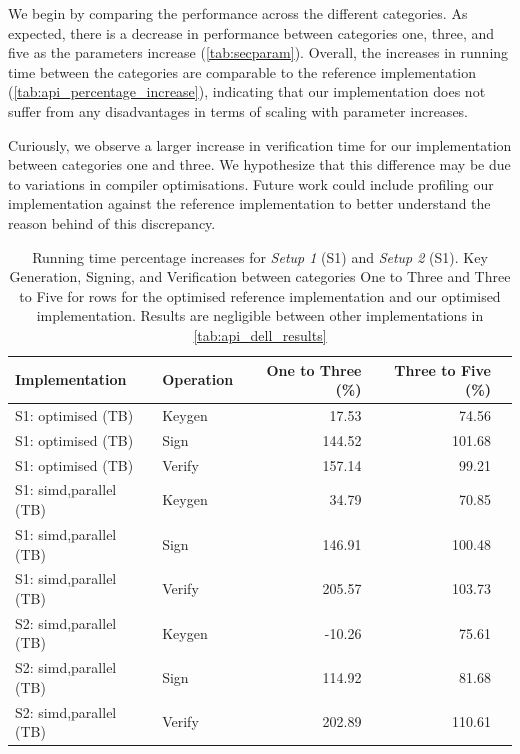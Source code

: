 \documentclass[11pt]{report}
\theoremstyle{definition}
\theoremstyle{plain}
\begin{document}
We begin by comparing the performance across the different categories. As expected, there is a decrease in performance between categories one, three, and five as the parameters increase (\autoref{tab:secparam}). Overall, the increases in running time between the categories are comparable to the reference implementation (\autoref{tab:api_percentage_increase}), indicating that our implementation does not suffer from any disadvantages in terms of scaling with parameter increases.

Curiously, we observe a larger increase in verification time for our implementation between categories one and three. We hypothesize that this difference may be due to variations in compiler optimisations. Future work could include profiling our implementation against the reference implementation to better understand the reason behind of this discrepancy.

\begin{table}[!ht]
  \centering
  \begin{tabular}{l|l|rrr}
    \hline
    Implementation                              & Operation & One to Three (\%) & Three to Five (\%) \\
    \hline
    S1: optimised (TB)~\cite{aguilarsyndrome11} & Keygen    & 17.53             & 74.56              \\
    S1: optimised (TB)~\cite{aguilarsyndrome11} & Sign      & 144.52            & 101.68             \\
    S1: optimised (TB)~\cite{aguilarsyndrome11} & Verify    & 157.14            & 99.21              \\
    \hline
    S1: simd,parallel (TB)                      & Keygen    & 34.79             & 70.85              \\
    S1: simd,parallel (TB)                      & Sign      & 146.91            & 100.48             \\
    S1: simd,parallel (TB)                      & Verify    & 205.57            & 103.73             \\
    \hline
    S2: simd,parallel (TB)                      & Keygen    & -10.26            & 75.61              \\
    S2: simd,parallel (TB)                      & Sign      & 114.92            & 81.68              \\
    S2: simd,parallel (TB)                      & Verify    & 202.89            & 110.61             \\
    \hline
  \end{tabular}
  \caption{Running time percentage increases for \textit{Setup 1} (S1) and \textit{Setup 2} (S1). Key Generation, Signing, and Verification between categories One to Three and Three to Five for rows for the optimised reference implementation \cite{aguilarsyndrome11} and our optimised implementation. Results are negligible between other implementations in \autoref{tab:api_dell_results}}
  \label{tab:api_percentage_increase}
\end{table}
\end{document}
